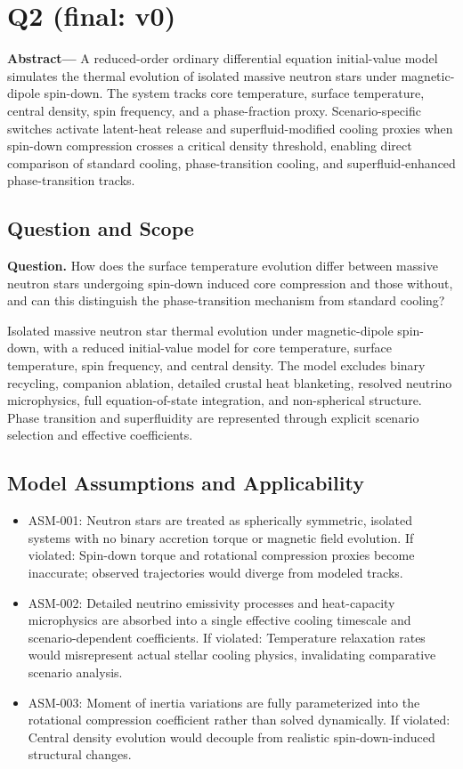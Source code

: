 \documentclass[11pt]{article}
\begin{document}
\section{Q2 (final: v0)}

\noindent\textbf{Abstract—} A reduced-order ordinary differential equation initial-value model simulates the thermal evolution of isolated massive neutron stars under magnetic-dipole spin-down. The system tracks core temperature, surface temperature, central density, spin frequency, and a phase-fraction proxy. Scenario-specific switches activate latent-heat release and superfluid-modified cooling proxies when spin-down compression crosses a critical density threshold, enabling direct comparison of standard cooling, phase-transition cooling, and superfluid-enhanced phase-transition tracks.

\subsection{Question and Scope}

\noindent\textbf{Question.} How does the surface temperature evolution differ between massive neutron stars undergoing spin-down induced core compression and those without, and can this distinguish the phase-transition mechanism from standard cooling?



Isolated massive neutron star thermal evolution under magnetic-dipole spin-down, with a reduced initial-value model for core temperature, surface temperature, spin frequency, and central density. The model excludes binary recycling, companion ablation, detailed crustal heat blanketing, resolved neutrino microphysics, full equation-of-state integration, and non-spherical structure. Phase transition and superfluidity are represented through explicit scenario selection and effective coefficients.

\subsection{Model Assumptions and Applicability}

\begin{itemize}
\item ASM-001: Neutron stars are treated as spherically symmetric, isolated systems with no binary accretion torque or magnetic field evolution. If violated: Spin-down torque and rotational compression proxies become inaccurate; observed trajectories would diverge from modeled tracks.
\item ASM-002: Detailed neutrino emissivity processes and heat-capacity microphysics are absorbed into a single effective cooling timescale and scenario-dependent coefficients. If violated: Temperature relaxation rates would misrepresent actual stellar cooling physics, invalidating comparative scenario analysis.
\item ASM-003: Moment of inertia variations are fully parameterized into the rotational compression coefficient rather than solved dynamically. If violated: Central density evolution would decouple from realistic spin-down-induced structural changes.
\end{itemize}
\end{document}
